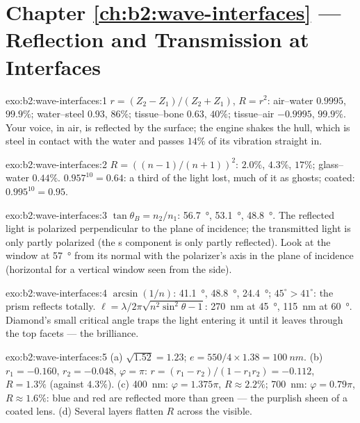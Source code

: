 \section*{Chapter \ref{ch:b2:wave-interfaces} --- Reflection and Transmission at Interfaces}

\begin{solution}{exo:b2:wave-interfaces:1}
$r = (Z_2 - Z_1)/(Z_2 + Z_1)$, $R = r^2$: air--water $0.9995$, $99.9\%$;
water--steel $0.93$, $86\%$; tissue--bone $0.63$, $40\%$; tissue--air
$-0.9995$, $99.9\%$. Your voice, in air, is reflected by the surface; the
engine shakes the hull, which is steel in contact with the water and
passes $14\%$ of its vibration straight in.
\end{solution}

\begin{solution}{exo:b2:wave-interfaces:2}
$R = ((n - 1)/(n + 1))^2$: $2.0\%$, $4.3\%$, $17\%$; glass--water $0.44\%$.
$0.957^{10} = 0.64$: a third of the light lost, much of it as ghosts;
coated: $0.995^{10} = 0.95$.
\end{solution}

\begin{solution}{exo:b2:wave-interfaces:3}
$\tan\theta_B = n_2/n_1$: \qty{56.7}{\degree}, \qty{53.1}{\degree}, \qty{48.8}{\degree}. The
reflected light is polarized perpendicular to the plane of incidence;
the transmitted light is only partly polarized (the s component is
only partly reflected). Look at the window at \qty{57}{\degree} from its
normal with the polarizer's axis in the plane of incidence (horizontal
for a vertical window seen from the side).
\end{solution}

\begin{solution}{exo:b2:wave-interfaces:4}
$\arcsin(1/n)$: \qty{41.1}{\degree}, \qty{48.8}{\degree}, \qty{24.4}{\degree}; $45^\circ > 41^\circ$:
the prism reflects totally. $\ell = \lambda/2\pi\sqrt{n^2\sin^2\theta - 1}$: \qty{270}{nm}
at \qty{45}{\degree}, \qty{115}{nm} at \qty{60}{\degree}. Diamond's small critical angle
traps the light entering it until it leaves through the top facets ---
the brilliance.
\end{solution}

\begin{solution}{exo:b2:wave-interfaces:5}
(a) $\sqrt{1.52} = 1.23$; $e = 550/4 \times 1.38 = \qty{100}{nm}$. (b) $r_1 = -0.160$, $r_2 =
-0.048$, $\varphi = \pi$: $r = (r_1 - r_2)/(1 - r_1r_2) = -0.112$, $R = 1.3\%$ (against
$4.3\%$). (c) \qty{400}{nm}: $\varphi = 1.375\pi$, $R \approx 2.2\%$; \qty{700}{nm}: $\varphi =
0.79\pi$, $R \approx 1.6\%$: blue and red are reflected more than green ---
the purplish sheen of a coated lens. (d) Several layers flatten $R$
across the visible.
\end{solution}

